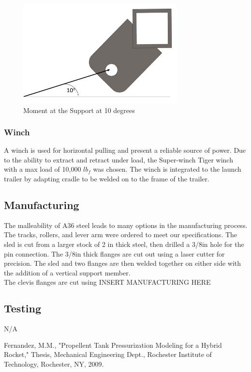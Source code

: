 \documentclass[10pt,a4paper]{article}
\begin{document}
 
\begin{figure}
	\centering
	\includegraphics[width=0.75\textwidth]{./figs/clevis_good_10.png}
	\caption{Moment at the Support at 10 degrees}
	\label{fig:angle_10}
\end{figure} 
\subsubsection{Winch}
A winch is used for horizontal pulling and present a reliable source of power. Due to the ability to extract and retract under load, the Super-winch Tiger winch with a max load of 10,000 $lb_f$ was chosen. The winch is integrated to the launch trailer by adapting cradle to be welded on to the frame of the trailer. 

\subsection{Manufacturing}
The malleability of A36 steel leads to many options in the manufacturing process. The tracks, rollers, and lever arm were ordered to meet our specifications. The sled is cut from a larger stock of 2 in thick steel, then drilled a 3/8in hole for the pin connection. The 3/8in thick flanges are cut out using a laser cutter for precision. The sled and two flanges are then welded together on either side with the addition of a vertical support member. \\
The clevis flanges are cut using INSERT MANUFACTURING HERE

 
\subsection{Testing}
N/A\\


\begin{thebibliography}{10}
	
	Fernandez, M.M., 
	"Propellent Tank Pressurization Modeling for a Hybrid Rocket,"
	Thesis, Mechanical Engineering Dept., Rochester Institute of      
	Technology, 
	Rochester, NY, 2009.
	
\end{thebibliography}
\end{document}
